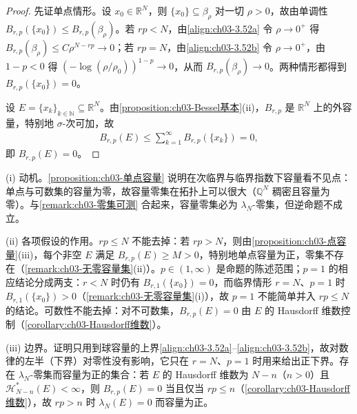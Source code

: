\documentclass[../../main.tex]{subfiles}%
\begin{document}
\begin{proof}
先证单点情形。设 $x_0\in\mathbb{R}^N$，则 $\{x_0\}\subseteq\beta_\rho$ 对一切 $\rho>0$，故由单调性 $B_{r,p}(\{x_0\})\leqslant B_{r,p}(\beta_\rho)$。若 $rp<N$，由\eqref{align:ch03-3.52a} 令 $\rho\to0^+$ 得 $B_{r,p}(\beta_\rho)\leqslant C\rho^{N-rp}\to0$；若 $rp=N$，由\eqref{align:ch03-3.52b} 令 $\rho\to0^+$，由 $1-p<0$ 得 $\left(-\log(\rho/\rho_0)\right)^{1-p}\to0$，从而 $B_{r,p}(\beta_\rho)\to0$。两种情形都得到 $B_{r,p}(\{x_0\})=0$。

设 $E=\{x_k\}_{k\in\mathbb{N}}\subseteq\mathbb{R}^N$。由\cref{proposition:ch03-Bessel基本}(ii)，$B_{r,p}$ 是 $\mathbb{R}^N$ 上的外容量，特别地 $\sigma$-次可加，故
\begin{align*}
B_{r,p}(E)\leqslant\sum_{k=1}^{\infty}B_{r,p}(\{x_k\})=0,
\end{align*}
即 $B_{r,p}(E)=0$。
\end{proof}

\begin{remark}\label{remark:ch03-单点容量动机}
(i) 动机。\cref{proposition:ch03-单点容量} 说明在次临界与临界指数下容量看不见点：单点与可数集的容量为零，故容量零集在拓扑上可以很大（$\mathbb{Q}^N$ 稠密且容量为零）。与\cref{remark:ch03-零集可测} 合起来，容量零集必为 $\lambda_N$-零集，但逆命题不成立。

(ii) 各项假设的作用。$rp\leqslant N$ 不能去掉：若 $rp>N$，则由\cref{proposition:ch03-点容量}(iii)，每个非空 $E$ 满足 $B_{r,p}(E)\geqslant M>0$，特别地单点容量为正，零集不存在（\cref{remark:ch03-无零容量集}(ii)）。$p\in(1,\infty)$ 是命题的陈述范围；$p=1$ 的相应结论分成两支：$r<N$ 时仍有 $B_{r,1}(\{x_0\})=0$，而临界情形 $r=N$、$p=1$ 时 $B_{r,1}(\{x_0\})>0$（\cref{remark:ch03-无零容量集}(i)），故 $p=1$ 不能简单并入 $rp\leqslant N$ 的结论。可数性不能去掉：对不可数集，$B_{r,p}(E)=0$ 由 $E$ 的 Hausdorff 维数控制（\cref{corollary:ch03-Hausdorff维数}）。

(iii) 边界。证明只用到球容量的上界\eqref{align:ch03-3.52a}--\eqref{align:ch03-3.52b}，故对数律的左半（下界）对零性没有影响，它只在 $r=N$、$p=1$ 时用来给出正下界。存在 $\lambda_N$-零集而容量为正的集合：若 $E$ 的 Hausdorff 维数为 $N-n$（$n>0$）且 $\mathcal{H}^*_{N-n}(E)<\infty$，则 $B_{r,p}(E)=0$ 当且仅当 $rp\leqslant n$（\cref{corollary:ch03-Hausdorff维数}），故 $rp>n$ 时 $\lambda_N(E)=0$ 而容量为正。
\end{remark}
\end{document}

